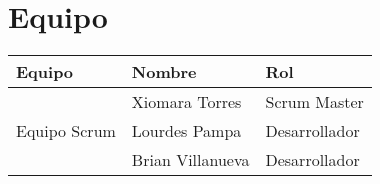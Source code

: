 \chapter{Equipo}
\begin{table}[htbp]
	\begin{center}
		\begin{tabular}{|l|l|l|}
			\hline
			\rowcolor{blue!40}   \textbf{Equipo}  &\textbf{Nombre}  & \textbf{Rol}   \\  \hline
			\multirow{3}{1cm}{Equipo Scrum} & Xiomara Torres & Scrum Master \\ \cline{2-2} & Lourdes Pampa & Desarrollador \\ \cline{2-2} & Brian Villanueva & Desarrollador \\ \hline
			
		\end{tabular}
	\end{center}
\end{table}